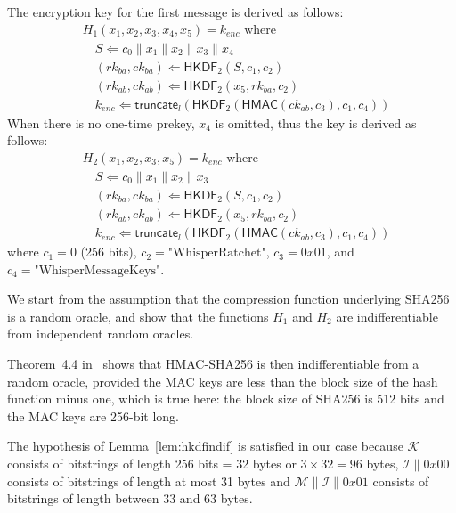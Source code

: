 \documentclass[compsoc, conference, letterpaper, 10pt, times]{IEEEtran}
\newcommand{\HMAC}{\mathsf{HMAC}}
\newcommand{\HKDF}{\mathsf{HKDF}}
\newcommand{\e}{\mathit{enc}}
\newcommand{\rk}{\mathit{rk}}
\newcommand{\ck}{\mathit{ck}}
\newcommand{\Skey}{\mathcal{K}}
\newcommand{\Sinfo}{\mathcal{I}}
\newcommand{\Smac}{\mathcal{M}}
\newcommand{\truncate}{\mathsf{truncate}}
\begin{document}
The encryption key for the first message is derived as follows:
\begin{align*}
&H_1(x_1, x_2, x_3, x_4, x_5) = k_{\e}\text{ where}\\
&\quad  S \Leftarrow c_0 \| x_1 \| x_2 \| x_3 \| x_4\\
&\quad  (\rk_{ba}, \ck_{ba}) \Leftarrow \HKDF_2(S, c_1, c_2)\\
&\quad  (\rk_{ab}, \ck_{ab}) \Leftarrow \HKDF_2(x_5, \rk_{ba}, c_2)\\
&\quad  k_{\e} \Leftarrow \truncate_l(\HKDF_2(\HMAC(\ck_{ab}, c_3), c_1, c_4))
\end{align*}
When there is no one-time prekey, $x_4$ is omitted, thus the key
is derived as follows:
\begin{align*}
&H_2(x_1, x_2, x_3, x_5) = k_{\e}\text{ where}\\
&\quad  S \Leftarrow c_0 \| x_1 \| x_2 \| x_3\\
&\quad  (\rk_{ba}, \ck_{ba}) \Leftarrow \HKDF_2(S, c_1, c_2)\\
&\quad  (\rk_{ab}, \ck_{ab}) \Leftarrow \HKDF_2(x_5, \rk_{ba}, c_2)\\
&\quad  k_{\e} \Leftarrow \truncate_l(\HKDF_2(\HMAC(\ck_{ab}, c_3), c_1, c_4))
\end{align*}
where $c_1 = 0$ (256 bits), $c_2 = \text{"WhisperRatchet"}$,
$c_3 = 0x01$, and $c_4 = \text{"WhisperMessageKeys"}$.

We start from the assumption that the compression function underlying
SHA256 is a random oracle, and show that the functions $H_1$ and $H_2$
are indifferentiable from independent random oracles.


Theorem~4.4 in~\cite{Dodis12} shows that HMAC-SHA256 is then indifferentiable from a random oracle, provided the MAC keys are less than the block size of the hash function minus one, which is true here: the block size of SHA256 is 512 bits and the MAC keys are 256-bit long.


The hypothesis of Lemma~\ref{lem:hkdfindif} is satisfied in our case
because $\Skey$ consists of bitstrings of length 256 bits = 32 bytes or $3 \times 32 = 96$ bytes,
$\Sinfo \| 0x00$ consists of bitstrings of length at most 31 bytes
and $\Smac \| \Sinfo \| 0x01$ consists of bitstrings of length between 33 and 63 bytes.
\end{document}
